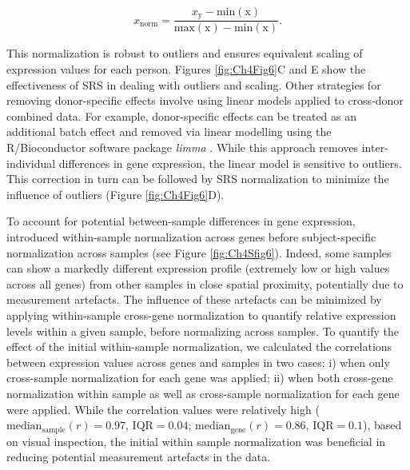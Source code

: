 \begin{equation}
    \label{eqn:eq3}
    x_\mathrm{norm} = \frac{x_\mathrm{y}-\mathrm{min(x)}}{\mathrm{max(x)}-\mathrm{min(x)}}.
\end{equation}

This normalization is robust to outliers and ensures equivalent scaling of expression values for each person. Figures \ref{fig:Ch4Fig6}C and E show the effectiveness of SRS in dealing with outliers and scaling. Other strategies for removing donor-specific effects involve using linear models applied to cross-donor combined data. For example, donor-specific effects can be treated as an additional batch effect and removed via linear modelling using the R/Bioconductor software package \textit{limma} \citep{Ritchie2015}. While this approach removes inter-individual differences in gene expression, the linear model is sensitive to outliers. This correction in turn can be followed by SRS normalization to minimize the influence of outliers (Figure \ref{fig:Ch4Fig6}D).

To account for potential between-sample differences in gene expression, \citet{Burt2018} introduced within-sample normalization across genes before subject-specific normalization across samples (see Figure \ref{fig:Ch4Sfig6}). Indeed, some samples can show a markedly different expression profile (extremely low or high values across all genes) from other samples in close spatial proximity, potentially due to measurement artefacts. The influence of these artefacts can be minimized by applying within-sample cross-gene normalization to quantify relative expression levels within a given sample, before normalizing across samples. To quantify the effect of the initial within-sample normalization, we calculated the correlations between expression values across genes and samples in two cases: i) when only cross-sample normalization for each gene was applied; ii) when both cross-gene normalization within sample as well as cross-sample normalization for each gene were applied. While the correlation values were relatively high ($\mathrm{median_\mathrm{sample}}(r) =  0.97$, $\mathrm{IQR} = 0.04$; $\mathrm{median_\mathrm{gene}}(r) = 0.86$, $\mathrm{IQR} = 0.1$), based on visual inspection, the initial within sample normalization was beneficial in reducing potential measurement artefacts in the data.

